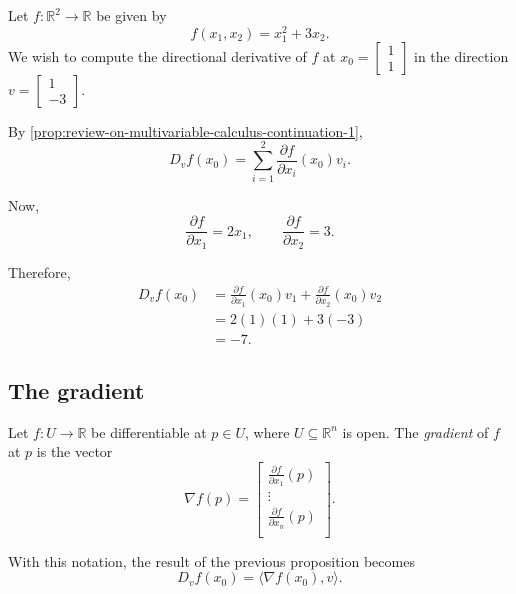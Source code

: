 \begin{example}
	Let $f:\mathbb{R}^2\to\mathbb{R}$ be given by
	\[
		f(x_1,x_2)=x_1^2+3x_2.
	\]
	We wish to compute the directional derivative of $f$ at \( x_0=\begin{bmatrix}1\\1\end{bmatrix} \) in the direction \( v=\begin{bmatrix}1\\-3\end{bmatrix} \).

	By \autoref{prop:review-on-multivariable-calculus-continuation-1},
	\[
		D_vf(x_0) = \sum_{i=1}^2 \frac{\partial f}{\partial x_i}(x_0)v_i.
	\]

	Now,
	\[
		\frac{\partial f}{\partial x_1}=2x_1,
		\qquad
		\frac{\partial f}{\partial x_2}=3.
	\]

	Therefore,
	\[
		\begin{aligned}
			D_vf(x_0) & = \frac{\partial f}{\partial x_1}(x_0)v_1 +\frac{\partial f}{\partial x_2}(x_0)v_2 \\
			          & =2(1)(1)+3(-3)                                                                     \\
			          & =-7.
		\end{aligned}
	\]
\end{example}

\subsection{The gradient}

\begin{definition}[Gradient]
	Let $f:U\to\mathbb{R}$ be differentiable at
	$p\in U$, where $U\subseteq\mathbb{R}^n$ is open.
	The \emph{gradient} of $f$ at $p$ is the vector
	\begin{equation}
		\nabla f(p)
		=\begin{bmatrix}
			\frac{\partial f}{\partial x_1}(p) \\
			\vdots                             \\
			\frac{\partial f}{\partial x_n}(p) \\
		\end{bmatrix}.
		\label{eq:gradient-definition}
	\end{equation}
\end{definition}

With this notation, the result of the previous proposition becomes
\begin{equation}
	D_vf(x_0)=\langle\nabla f(x_0),v\rangle.
	\label{eq:directional-derivative-inner-product}
\end{equation}


